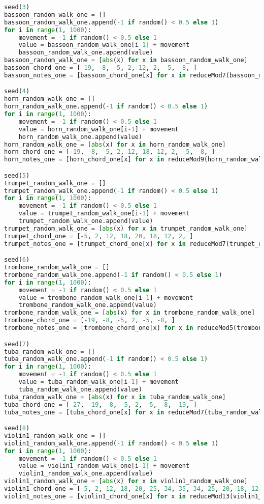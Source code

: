 \begin{lstlisting}[language=Python, caption=Tianshu Segment\_IV]
seed(3)
bassoon_random_walk_one = []
bassoon_random_walk_one.append(-1 if random() < 0.5 else 1)
for i in range(1, 1000):
    movement = -1 if random() < 0.5 else 1
    value = bassoon_random_walk_one[i-1] + movement
    bassoon_random_walk_one.append(value)
bassoon_random_walk_one = [abs(x) for x in bassoon_random_walk_one]
bassoon_chord_one = [-19, -8, -5, 2, 12, 2, -5, -8, ]
bassoon_notes_one = [bassoon_chord_one[x] for x in reduceMod7(bassoon_random_walk_one)]

seed(4)
horn_random_walk_one = []
horn_random_walk_one.append(-1 if random() < 0.5 else 1)
for i in range(1, 1000):
    movement = -1 if random() < 0.5 else 1
    value = horn_random_walk_one[i-1] + movement
    horn_random_walk_one.append(value)
horn_random_walk_one = [abs(x) for x in horn_random_walk_one]
horn_chord_one = [-19, -8, -5, 2, 12, 18, 12, 2, -5, -8, ]
horn_notes_one = [horn_chord_one[x] for x in reduceMod9(horn_random_walk_one)]

seed(5)
trumpet_random_walk_one = []
trumpet_random_walk_one.append(-1 if random() < 0.5 else 1)
for i in range(1, 1000):
    movement = -1 if random() < 0.5 else 1
    value = trumpet_random_walk_one[i-1] + movement
    trumpet_random_walk_one.append(value)
trumpet_random_walk_one = [abs(x) for x in trumpet_random_walk_one]
trumpet_chord_one = [-5, 2, 12, 18, 20, 18, 12, 2, ]
trumpet_notes_one = [trumpet_chord_one[x] for x in reduceMod7(trumpet_random_walk_one)]

seed(6)
trombone_random_walk_one = []
trombone_random_walk_one.append(-1 if random() < 0.5 else 1)
for i in range(1, 1000):
    movement = -1 if random() < 0.5 else 1
    value = trombone_random_walk_one[i-1] + movement
    trombone_random_walk_one.append(value)
trombone_random_walk_one = [abs(x) for x in trombone_random_walk_one]
trombone_chord_one = [-19, -8, -5, 2, -5, -8, ]
trombone_notes_one = [trombone_chord_one[x] for x in reduceMod5(trombone_random_walk_one)]

seed(7)
tuba_random_walk_one = []
tuba_random_walk_one.append(-1 if random() < 0.5 else 1)
for i in range(1, 1000):
    movement = -1 if random() < 0.5 else 1
    value = tuba_random_walk_one[i-1] + movement
    tuba_random_walk_one.append(value)
tuba_random_walk_one = [abs(x) for x in tuba_random_walk_one]
tuba_chord_one = [-27, -19, -8, -5, 2, -5, -8, -19, ]
tuba_notes_one = [tuba_chord_one[x] for x in reduceMod7(tuba_random_walk_one)]

seed(8)
violin1_random_walk_one = []
violin1_random_walk_one.append(-1 if random() < 0.5 else 1)
for i in range(1, 1000):
    movement = -1 if random() < 0.5 else 1
    value = violin1_random_walk_one[i-1] + movement
    violin1_random_walk_one.append(value)
violin1_random_walk_one = [abs(x) for x in violin1_random_walk_one]
violin1_chord_one = [-5, 2, 12, 18, 20, 25, 34, 35, 34, 25, 20, 18, 12, 2, ]
violin1_notes_one = [violin1_chord_one[x] for x in reduceMod13(violin1_random_walk_one)]


\end{lstlisting}
